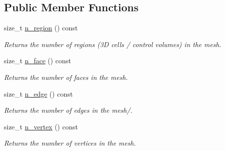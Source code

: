 \subsection*{Public Member Functions}
\begin{DoxyCompactItemize}
\item 
\mbox{\label{classStemMesh3D_1_1mesh__3Dv_ab7799362e99de42d7fef62d12f007367}} 
size\+\_\+t \hyperlink{classStemMesh3D_1_1mesh__3Dv_ab7799362e99de42d7fef62d12f007367}{n\+\_\+region} () const
\begin{DoxyCompactList}\small\item\em Returns the number of regions (3D cells / control volumes) in the mesh. \end{DoxyCompactList}\item 
\mbox{\label{classStemMesh3D_1_1mesh__3Dv_a06d9c5f13b364627149ea844501e9441}} 
size\+\_\+t \hyperlink{classStemMesh3D_1_1mesh__3Dv_a06d9c5f13b364627149ea844501e9441}{n\+\_\+face} () const
\begin{DoxyCompactList}\small\item\em Returns the number of faces in the mesh. \end{DoxyCompactList}\item 
\mbox{\label{classStemMesh3D_1_1mesh__3Dv_a8068061ffd6a9080b92d25270c1f668d}} 
size\+\_\+t \hyperlink{classStemMesh3D_1_1mesh__3Dv_a8068061ffd6a9080b92d25270c1f668d}{n\+\_\+edge} () const
\begin{DoxyCompactList}\small\item\em Returns the number of edges in the mesh/. \end{DoxyCompactList}\item 
\mbox{\label{classStemMesh3D_1_1mesh__3Dv_ac29b66e58fbd9bc301118bea14426709}} 
size\+\_\+t \hyperlink{classStemMesh3D_1_1mesh__3Dv_ac29b66e58fbd9bc301118bea14426709}{n\+\_\+vertex} () const
\begin{DoxyCompactList}\small\item\em Returns the number of vertices in the mesh. \end{DoxyCompactList}\item 
\mbox{\label{classStemMesh3D_1_1mesh__3Dv_a7c885048a027fc84eb6d2b7e2590c5e2}} 

\end{DoxyCompactItemize}
